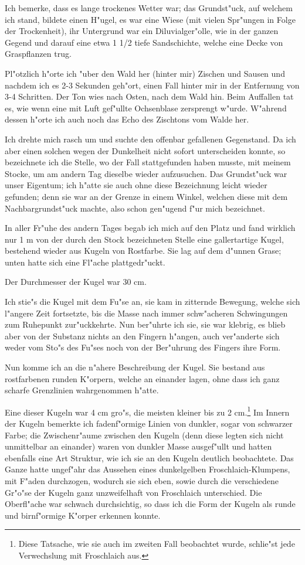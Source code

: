 \documentclass[a4paper, 11pt, oneside, german]{article}
\begin{document}
Ich bemerke, dass es lange trockenes Wetter war; das Grundst"uck, auf welchem ich stand, bildete einen H"ugel, es war eine Wiese (mit vielen Spr"ungen in Folge der Trockenheit), ihr Untergrund war ein Diluvialger"olle, wie in der ganzen Gegend und darauf eine etwa 1 1/2 tiefe Sandschichte, welche eine Decke von Graspflanzen trug.

Pl"otzlich h"orte ich "uber den Wald her (hinter mir) Zischen und Sausen und nachdem ich es 2-3 Sekunden geh"ort, einen Fall hinter mir in der Entfernung von 3-4 Schritten. Der Ton wies nach Osten, nach dem Wald hin. Beim Auffallen tat es, wie wenn eine mit Luft gef"ullte Ochsenblase zersprengt w"urde. W"ahrend dessen h"orte ich auch noch das Echo des Zischtons vom Walde her.

Ich drehte mich rasch um und suchte den offenbar gefallenen Gegenstand. Da ich aber einen solchen wegen der Dunkelheit nicht sofort unterscheiden konnte, so bezeichnete ich die Stelle, wo der Fall stattgefunden haben musste, mit meinem Stocke, um am andern Tag dieselbe wieder aufzusuchen. Das Grundst"uck war unser Eigentum; ich h"atte sie auch ohne diese Bezeichnung leicht wieder gefunden; denn sie war an der Grenze in einem Winkel, welchen diese mit dem Nachbargrundst"uck machte, also schon gen"ugend f"ur mich bezeichnet.

In aller Fr"uhe des andern Tages begab ich mich auf den Platz und fand wirklich nur 1 m von der durch den Stock bezeichneten Stelle eine gallertartige Kugel, bestehend wieder aus Kugeln von Rostfarbe. Sie lag auf dem d"unnen Grase; unten hatte sich eine Fl"ache plattgedr"uckt.

Der Durchmesser der Kugel war 30 cm.

Ich stie"s die Kugel mit dem Fu"se an, sie kam in zitternde Bewegung, welche sich l"angere Zeit fortsetzte, bis die Masse nach immer schw"acheren Schwingungen zum Ruhepunkt zur"uckkehrte. Nun ber"uhrte ich sie, sie war klebrig, es blieb aber von der Substanz nichts an den Fingern h"angen, auch ver"anderte sich weder vom Sto"s des Fu"ses noch von der Ber"uhrung des Fingers ihre Form.

Nun komme ich an die n"ahere Beschreibung der Kugel. Sie bestand aus rostfarbenen runden K"orpern, welche an einander lagen, ohne dass ich ganz scharfe Grenzlinien wahrgenommen h"atte.

Eine dieser Kugeln war 4 cm gro"s, die meisten kleiner bis zu 2 cm.\footnote{Diese Tatsache, wie sie auch im zweiten Fall beobachtet wurde, schlie"st jede Verwechslung mit Froschlaich aus.} Im Innern der Kugeln bemerkte ich fadenf"ormige Linien von dunkler, sogar von schwarzer Farbe; die Zwischenr"aume zwischen den Kugeln (denn diese legten sich nicht unmittelbar an einander) waren von dunkler Masse ausgef"ullt und hatten ebenfalls eine Art Struktur, wie ich sie an den Kugeln deutlich beobachtete. Das Ganze hatte ungef"ahr das Aussehen eines dunkelgelben Froschlaich-Klumpens, mit F"aden durchzogen, wodurch sie sich eben, sowie durch die verschiedene Gr"o"se der Kugeln ganz unzweifelhaft von Froschlaich unterschied. Die Oberfl"ache war schwach durchsichtig, so dass ich die Form der Kugeln als runde und birnf"ormige K"orper erkennen konnte.
\end{document}
